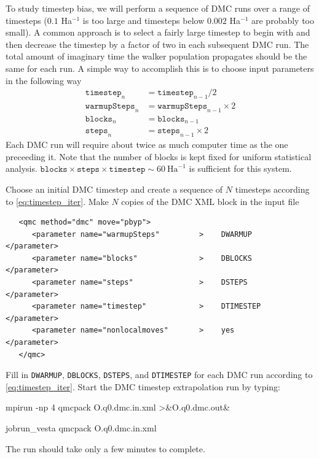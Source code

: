 To study timestep bias, we will perform a sequence of DMC runs over a range of timesteps ($0.1$ Ha$^{-1}$ is too large and timesteps below $0.002$ Ha$^{-1}$ are probably too small).  A common approach is to select a fairly large timestep to begin with and then decrease the timestep by a factor of two in each subsequent DMC run.  The total amount of imaginary time the walker population propagates should be the same for each run.  A simple way to accomplish this is to choose input parameters in the following way
\begin{align}\label{eq:timestep_iter}
  \texttt{timestep}_{n}    &= \texttt{timestep}_{n-1}/2\nonumber\\
  \texttt{warmupSteps}_{n} &= \texttt{warmupSteps}_{n-1}\times 2\nonumber\\
  \texttt{blocks}_{n}      &= \texttt{blocks}_{n-1}\nonumber\\
  \texttt{steps}_{n}       &= \texttt{steps}_{n-1}\times 2
\end{align}
Each DMC run will require about twice as much computer time as the one preceeding it.  Note that the number of blocks is kept fixed for uniform statistical analysis.  $\texttt{blocks}\times\texttt{steps}\times\texttt{timestep}\sim 60~\mathrm{Ha}^{-1}$ is sufficient for this system.

Choose an initial DMC timestep and create a sequence of $N$ timesteps according to \ref{eq:timestep_iter}.  Make $N$ copies of the DMC XML block in the input file
\begin{lstlisting}
   <qmc method="dmc" move="pbyp">
      <parameter name="warmupSteps"         >    DWARMUP         </parameter>
      <parameter name="blocks"              >    DBLOCKS         </parameter>
      <parameter name="steps"               >    DSTEPS          </parameter>
      <parameter name="timestep"            >    DTIMESTEP       </parameter>
      <parameter name="nonlocalmoves"       >    yes             </parameter>
   </qmc>
\end{lstlisting}
\noindent
Fill in \texttt{DWARMUP}, \texttt{DBLOCKS}, \texttt{DSTEPS}, and \texttt{DTIMESTEP} for each DMC run according to \ref{eq:timestep_iter}.  Start the DMC timestep extrapolation run by typing:  
\ifws
\begin{shade}
mpirun -np 4 qmcpack O.q0.dmc.in.xml >&O.q0.dmc.out&
\end{shade}
\else
\begin{shade}
jobrun_vesta qmcpack O.q0.dmc.in.xml
\end{shade}
\fi
\noindent
The run should take only a few minutes to complete.

